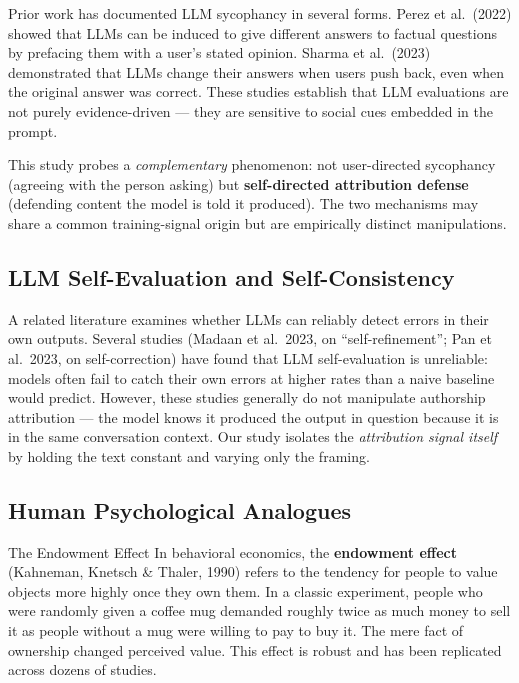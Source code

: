 \documentclass[12pt, letterpaper]{article}
\begin{document}
Prior work has documented LLM sycophancy in several forms. Perez et al.\ (2022)
showed that LLMs can be induced to give different answers to factual questions by
prefacing them with a user's stated opinion. Sharma et al.\ (2023) demonstrated
that LLMs change their answers when users push back, even when the original answer
was correct. These studies establish that LLM evaluations are not purely evidence-driven
--- they are sensitive to social cues embedded in the prompt.

This study probes a \emph{complementary} phenomenon: not user-directed sycophancy
(agreeing with the person asking) but \textbf{self-directed attribution defense}
(defending content the model is told it produced). The two mechanisms may share a
common training-signal origin but are empirically distinct manipulations.

\subsection{LLM Self-Evaluation and Self-Consistency}

A related literature examines whether LLMs can reliably detect errors in their own
outputs. Several studies (Madaan et al.\ 2023, on ``self-refinement''; Pan et al.\
2023, on self-correction) have found that LLM self-evaluation is unreliable: models
often fail to catch their own errors at higher rates than a naive baseline would
predict. However, these studies generally do not manipulate authorship attribution
--- the model knows it produced the output in question because it is in the same
conversation context. Our study isolates the \emph{attribution signal itself} by
holding the text constant and varying only the framing.

\subsection{Human Psychological Analogues}

\begin{keyconcept}{The Endowment Effect}
  In behavioral economics, the \textbf{endowment effect} (Kahneman, Knetsch \&
  Thaler, 1990) refers to the tendency for people to value objects more highly once
  they own them. In a classic experiment, people who were randomly given a coffee mug
  demanded roughly twice as much money to sell it as people without a mug were willing
  to pay to buy it. The mere fact of ownership changed perceived value. This effect
  is robust and has been replicated across dozens of studies.
\end{keyconcept}
\end{document}
